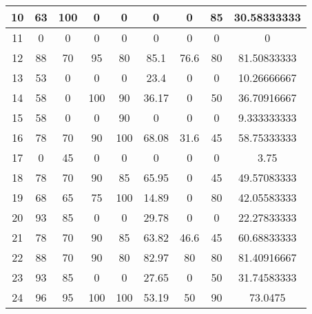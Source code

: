 \begin{table}[H]
\begin{tabular}{|c|c|c|c|c|c|c|c|c|}
10          & 63          & 100         & 0           & 0            & 0           & 0           & 85            & 30.58333333         \\ \hline
11          & 0           & 0           & 0           & 0            & 0           & 0           & 0             & 0                   \\ \hline
12          & 88          & 70          & 95          & 80           & 85.1        & 76.6        & 80            & 81.50833333         \\ \hline
13          & 53          & 0           & 0           & 0            & 23.4        & 0           & 0             & 10.26666667         \\ \hline
14          & 58          & 0           & 100         & 90           & 36.17       & 0           & 50            & 36.70916667         \\ \hline
15          & 58          & 0           & 0           & 90           & 0           & 0           & 0             & 9.333333333         \\ \hline
16          & 78          & 70          & 90          & 100          & 68.08       & 31.6        & 45            & 58.75333333         \\ \hline
17          & 0           & 45          & 0           & 0            & 0           & 0           & 0             & 3.75                \\ \hline
18          & 78          & 70          & 90          & 85           & 65.95       & 0           & 45            & 49.57083333         \\ \hline
19          & 68          & 65          & 75          & 100          & 14.89       & 0           & 80            & 42.05583333         \\ \hline
20          & 93          & 85          & 0           & 0            & 29.78       & 0           & 0             & 22.27833333         \\ \hline
21          & 78          & 70          & 90          & 85           & 63.82       & 46.6        & 45            & 60.68833333         \\ \hline
22          & 88          & 70          & 90          & 80           & 82.97       & 80          & 80            & 81.40916667         \\ \hline
23          & 93          & 85          & 0           & 0            & 27.65       & 0           & 50            & 31.74583333         \\ \hline
24          & 96          & 95          & 100         & 100          & 53.19       & 50          & 90            & 73.0475             \\ \hline

\end{tabular}
\end{table}

